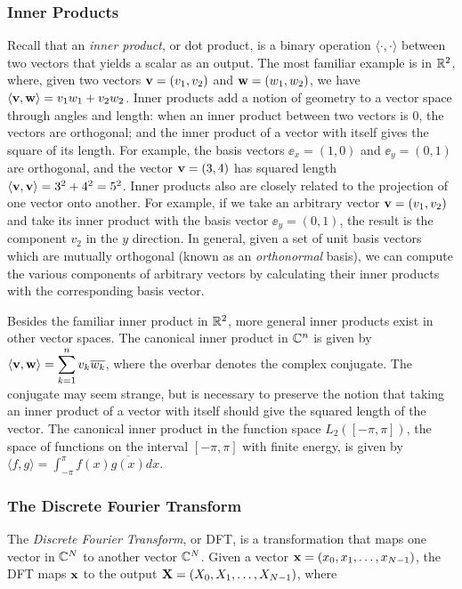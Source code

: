 \subsubsection{Inner Products}
\label{sec:innerprod}
Recall that an {\em inner product}, or dot product, is a binary operation $\langle \cdot, \cdot \rangle$ between two vectors that yields a scalar as an output. The most familiar example is in $\mathbb{R}^2$, where, given two vectors $\mathbf{v} = (v_1, v_2)$ and $\mathbf{w} = (w_1, w_2)$, we have $\langle \mathbf{v}, \mathbf{w} \rangle = v_1w_1 + v_2w_2$. Inner products add a notion of geometry to a vector space through angles and length: when an inner product between two vectors is $0$, the vectors are orthogonal; and the inner product of a vector with itself gives the square of its length. For example, the basis vectors $\ee_x = (1, 0)$ and $\ee_y = (0, 1)$ are orthogonal, and the vector $\mathbf{v} = (3, 4)$ has squared length $\langle \mathbf{v}, \mathbf{v} \rangle = 3^2 + 4^2 = 5^2$. Inner products also are closely related to the projection of one vector onto another. For example, if we take an arbitrary vector $\mathbf{v} = (v_1, v_2)$ and take its inner product with the basis vector $\ee_y = (0, 1)$, the result is the component $v_2$ in the $y$ direction. In general, given a set of unit basis vectors which are mutually orthogonal (known as an {\em orthonormal} basis), we can compute the various components of arbitrary vectors by calculating their inner products with the corresponding basis vector.

Besides the familiar inner product in $\mathbb{R}^2$, more general inner products exist in other vector spaces. The canonical inner product in $\mathbb{C}^n$ is given by $\langle \mathbf{v}, \mathbf{w} \rangle = \displaystyle \sum_{k=1}^{n}v_k\overline{w_k}$, where the overbar denotes the complex conjugate. The conjugate may seem strange, but is necessary to preserve the notion that taking an inner product of a vector with itself should give the squared length of the vector. The canonical inner product in the function space $L_2([-\pi, \pi])$, the space of functions on the interval $[-\pi, \pi]$ with finite energy, is given by $\langle f, g \rangle  = \displaystyle \int_{-\pi}^{\pi}f(x)\overline{g(x)}dx$.

\subsubsection{The Discrete Fourier Transform}
The {\em Discrete Fourier Transform}, or DFT, is a transformation that maps one vector in $\mathbb{C}^{N}$ to another vector $\mathbb{C}^{N}$. Given a vector $\mathbf{x} = \left(x_0, x_1, \dots, x_{N-1}\right)$, the DFT maps $\mathbf{x}$ to the output $\mathbf{X} = \left(X_0, X_1, \dots, X_{N-1}\right)$, where

